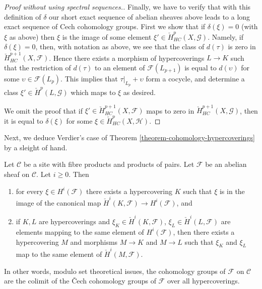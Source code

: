 \begin{proof}[Proof without using spectral sequences.]
\medskip\noindent
Finally, we have to verify that with this definition of $\delta$
our short exact sequence of abelian sheaves above leads to a
long exact sequence of Cech cohomology groups.
First we show that if $\delta(\xi) = 0$ (with $\xi$ as above) then
$\xi$ is the image of some element
$\xi' \in \check{H}^p_{HC}(X, \mathcal{G})$.
Namely, if $\delta(\xi) = 0$, then, with notation as above, we
see that the class of $d(\tau)$ is zero in
$\check{H}^{p + 1}_{HC}(X, \mathcal{F})$. Hence there exists
a morphism of hypercoverings $L \to K$ such that the restriction
of $d(\tau)$ to an element of $\mathcal{F}(L_{p + 1})$ is
equal to $d(\upsilon)$ for some $\upsilon \in \mathcal{F}(L_p)$.
This implies that $\tau|_{L_p} + \upsilon$ form a
cocycle, and determine a class $\xi' \in \check{H}^p(L, \mathcal{G})$
which maps to $\xi$ as desired.

\medskip\noindent
We omit the proof that if $\xi' \in \check{H}^{p + 1}_{HC}(X, \mathcal{F})$
maps to zero in $\check{H}^{p + 1}_{HC}(X, \mathcal{G})$, then it is
equal to $\delta(\xi)$ for some $\xi \in \check{H}^p_{HC}(X, \mathcal{H})$.
\end{proof}

\noindent
Next, we deduce Verdier's case of
Theorem \ref{theorem-cohomology-hypercoverings}
by a sleight of hand.

\begin{proposition}
\label{proposition-cohomology-hypercoverings}
Let $\mathcal{C}$ be a site with fibre products and products of pairs.
Let $\mathcal{F}$ be an abelian sheaf on $\mathcal{C}$.
Let $i \geq 0$. Then
\begin{enumerate}
\item for every $\xi \in H^i(\mathcal{F})$ there exists a hypercovering
$K$ such that $\xi$ is in the image of the canonical map
$\check{H}^i(K, \mathcal{F}) \to H^i(\mathcal{F})$, and
\item if $K, L$ are hypercoverings and $\xi_K \in \check{H}^i(K, \mathcal{F})$,
$\xi_L \in \check{H}^i(L, \mathcal{F})$ are elements mapping
to the same element of $H^i(\mathcal{F})$, then there exists
a hypercovering $M$ and morphisms $M \to K$ and $M \to L$ such
that $\xi_K$ and $\xi_L$ map to the same element of
$\check{H}^i(M, \mathcal{F})$.
\end{enumerate}
In other words, modulo set theoretical issues, the cohomology
groups of $\mathcal{F}$ on $\mathcal{C}$ are the colimit of
the {\v C}ech cohomology groups of $\mathcal{F}$ over all hypercoverings.
\end{proposition}

